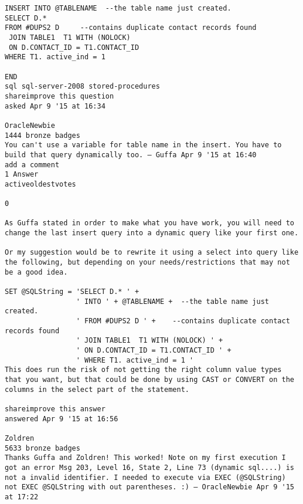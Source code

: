 \begin{lstlisting}
INSERT INTO @TABLENAME  --the table name just created.
SELECT D.*  
FROM #DUPS2 D     --contains duplicate contact records found
 JOIN TABLE1  T1 WITH (NOLOCK)
 ON D.CONTACT_ID = T1.CONTACT_ID
WHERE T1. active_ind = 1 

END
sql sql-server-2008 stored-procedures
shareimprove this question
asked Apr 9 '15 at 16:34

OracleNewbie
1444 bronze badges
You can't use a variable for table name in the insert. You have to build that query dynamically too. – Guffa Apr 9 '15 at 16:40 
add a comment
1 Answer
activeoldestvotes

0

As Guffa stated in order to make what you have work, you will need to change the last insert query into a dynamic query like your first one.

Or my suggestion would be to rewrite it using a select into query like the following, but depending on your needs/restrictions that may not be a good idea.

SET @SQLString = 'SELECT D.* ' +
                 ' INTO ' + @TABLENAME +  --the table name just created.
                 ' FROM #DUPS2 D ' +    --contains duplicate contact records found
                 ' JOIN TABLE1  T1 WITH (NOLOCK) ' +
                 ' ON D.CONTACT_ID = T1.CONTACT_ID ' +
                 ' WHERE T1. active_ind = 1 '
This does run the risk of not getting the right column value types that you want, but that could be done by using CAST or CONVERT on the columns in the select part of the statement.

shareimprove this answer
answered Apr 9 '15 at 16:56

Zoldren
5633 bronze badges
Thanks Guffa and Zoldren! This worked! Note on my first execution I got an error Msg 203, Level 16, State 2, Line 73 (dynamic sql....) is not a invalid identifier. I needed to execute via EXEC (@SQLString) not EXEC @SQLString with out parentheses. :) – OracleNewbie Apr 9 '15 at 17:22 

\end{lstlisting}